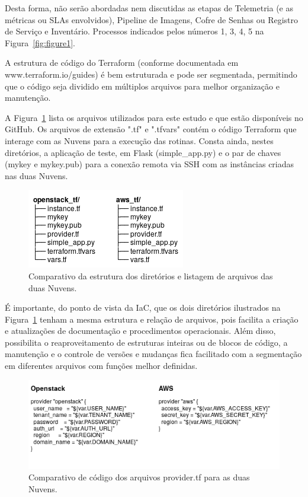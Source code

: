 \documentclass[12pt]{article}
\begin{document}
	Desta forma, não serão abordadas nem discutidas as etapas de Telemetria	(e as métricas ou SLAs envolvidos), Pipeline de Imagens, Cofre de Senhas ou Registro de Serviço e Inventário. Processos indicados pelos números 1, 3, 4, 5 na Figura~\ref{fig:figure1}.
	
	A estrutura de código do Terraform (conforme documentada em www.terraform.io/guides) é bem estruturada e pode ser segmentada, permitindo que o código seja dividido em múltiplos arquivos para melhor organização e manutenção. 
	
	A Figura~\ref{fig:figure3a} lista os arquivos utilizados para este estudo e que estão disponíveis no GitHub. Os arquivos de extensão ".tf" e ".tfvars" contém o código Terraform que interage com as Nuvens para a execução das rotinas. Consta ainda, nestes diretórios, a aplicação de teste, em Flask (simple\_app.py) e o par de chaves (mykey e mykey.pub) para a conexão remota via SSH com as instâncias criadas nas duas Nuvens.  
	
	\begin{figure}[H]
		\centering
		\includegraphics[width=0.42\linewidth]{figuras/Figure3a.png}
		\caption{Comparativo da estrutura dos diretórios e listagem de arquivos das duas Nuvens.}
		\label{fig:figure3a}
	\end{figure}
	
	É importante, do ponto de vista da IaC, que os dois diretórios ilustrados na Figura~\ref{fig:figure3a} tenham a mesma estrutura e relação de arquivos, pois facilita a criação e atualizações de documentação e procedimentos operacionais. Além disso, possibilita o reaproveitamento de estruturas inteiras ou de blocos de código, a manutenção e o controle de versões e mudanças fica facilitado com a segmentação em diferentes arquivos com funções melhor definidas. 
		
	\begin{figure}[H]
		\centering
		\includegraphics[width=0.8\linewidth]{figuras/Figure3b.png}
		\caption{Comparativo de código dos arquivos provider.tf para as duas Nuvens.}
		\label{fig:figure3b}
	\end{figure}
	
\end{document}
